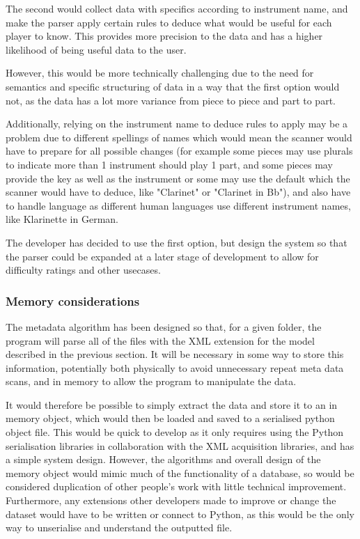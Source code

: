 The second would collect data with specifics according to instrument name, and make the parser apply certain rules to deduce what would be useful for each player to know. This provides more precision to the data and has a higher likelihood of being useful data to the user. 

However, this would be more technically challenging due to the need for semantics and specific structuring of data in a way that the first option would not, as the data has a lot more variance from piece to piece and part to part. 

Additionally, relying on the instrument name to deduce rules to apply may be a problem due to different spellings of names which would mean the scanner would have to prepare for all possible changes (for example some pieces may use plurals to indicate more than 1 instrument should play 1 part, and some pieces may provide the key as well as the instrument or some may use the default which the scanner would have to deduce, like "Clarinet" or "Clarinet in Bb"), and also have to handle language as different human languages use different instrument names, like Klarinette in German.

The developer has decided to use the first option, but design the system so that the parser could be expanded at a later stage of development to allow for difficulty ratings and other usecases.

\subsubsection{Memory considerations}
The metadata algorithm has been designed so that, for a given folder, the program will parse all of the files with the XML extension for the model described in the previous section. It will be necessary in some way to store this information, potentially both physically to avoid unnecessary repeat meta data scans, and in memory to allow the program to manipulate the data.

It would therefore be possible to simply extract the data and store it to an in memory object, which would then be loaded and saved to a serialised python object file. This would be quick to develop as it only requires using the Python serialisation libraries in collaboration with the XML acquisition libraries, and has a simple system design. 
However, the algorithms and overall design of the memory object would mimic much of the functionality of a database, so would be considered duplication of other people's work with little technical improvement. 
Furthermore, any extensions other developers made to improve or change the dataset would have to be written or connect to Python, as this would be the only way to unserialise and understand the outputted file.

